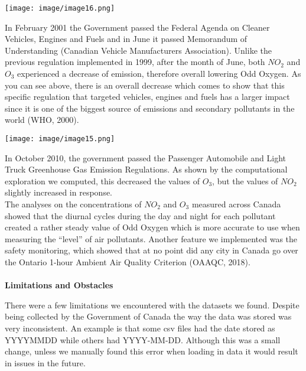 \documentclass[fontsize=11pt]{article}
\begin{document}
\begin{center}
\texttt{[image: image/image16.png]} \\
\end{center}

In February 2001 the Government passed the Federal Agenda on Cleaner Vehicles, Engines and Fuels and in June it passed Memorandum of Understanding (Canadian Vehicle Manufacturers Association). Unlike the previous regulation implemented in 1999, after the month of June, both $NO_2$ and $O_3$ experienced a decrease of emission, therefore overall lowering Odd Oxygen. As you can see above, there is an overall decrease which comes to show that this specific regulation that targeted vehicles, engines and fuels has a larger impact since it is one of the biggest source of emissions and secondary pollutants in the world (WHO, 2000).\\

\begin{center}
\texttt{[image: image/image15.png]} \\
\end{center}

In October 2010, the government passed the Passenger Automobile and Light Truck Greenhouse Gas Emission Regulations. As shown by the computational exploration we computed, this decreased the values of $O_3$, but the values of $NO_2$ slightly increased in response.\\

The analyses on the concentrations of $NO_2$ and $O_3$ measured across Canada showed that the diurnal cycles during the day and night for each pollutant created a rather steady value of Odd Oxygen which is more accurate to use when measuring the “level” of air pollutants. Another feature we implemented was the safety monitoring, which showed that at no point did any city in Canada go over the Ontario 1-hour Ambient Air Quality Criterion (OAAQC, 2018).\\ \\ \textbf{Limitations and Obstacles}

There were a few limitations we encountered with the datasets we found. Despite being collected by the Government of Canada the way the data was stored was very inconsistent. An example is that some csv files had the date stored as YYYYMMDD while others had YYYY-MM-DD. Although this was a small change, unless we manually found this error when loading in data it would result in issues in the future. \\
\end{document}
